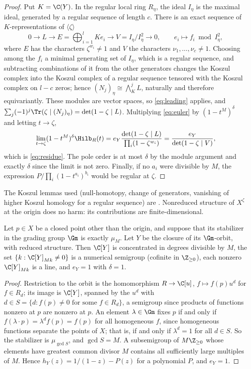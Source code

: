 \begin{proof}
Put $K=\C(Y)$. In the regular local ring $R_\eta$, the ideal $I_\eta$ is the
maximal ideal, generated by a regular sequence of length $c$. There is an
exact sequence of $K$-representations of $\langle\zeta\rangle$
\[
 0\to L\to E=\bigoplus_{i=1}^lKe_i\to V=I_\eta/I_\eta^2\to0,\qquad
 e_i\mapsto f_i\bmod I_\eta^2 ,
\]
where $E$ has the characters $\zeta^{w_i}\ne1$ and $V$ the characters
$\nu_1,\dots,\nu_c\ne1$. Choosing among the $f_i$ a minimal generating set of
$I_\eta$, which is a regular sequence, and subtracting combinations of it from
the other generators changes the Koszul complex into the Koszul complex of a
regular sequence tensored with the Koszul complex on $l-c$ zeros; hence
$(N_j)_\eta\cong\bigwedge^j_KL$, naturally and therefore equivariantly. These
modules are vector spaces, so \eqref{eq:leading} applies, and
$\sum_j(-1)^j\Tr(\zeta\mid(N_j)_\eta)=\det(1-\zeta\mid L)$. Multiplying
\eqref{eq:euler} by $(1-t^M)^\delta$ and letting $t\to\zeta$,
\[
 \lim_{t\to\zeta}(1-t^M)^\delta\Hilb_R(t)
 =e_Y\frac{\det(1-\zeta\mid L)}{\prod_i(1-\zeta^{w_i})}
 =\frac{e_Y}{\det(1-\zeta\mid V)} ,
\]
which is \eqref{eq:residue}. The pole order is at most $\delta$ by the module
argument and exactly $\delta$ since the limit is not zero. Finally, if no
$a_i$ were divisible by $M$, the expression $P/\prod_i(1-t^{a_i})^{b_i}$
would be regular at $\zeta$.
\end{proof}

The Koszul lemmas used (null-homotopy, change of generators, vanishing of
higher Koszul homology for a regular sequence) are
\cite[Tags 0621, 062F]{Stacks}. Nonreduced structure of $X^\zeta$ at the
origin does no harm: its contributions are finite-dimensional.

\begin{lemma}\label{lem:orbitclosure}
Let $p\in X$ be a closed point other than the origin, and suppose that its
stabilizer in the grading group $\Gm$ is exactly $\mu_M$. Let $Y$ be the
closure of its $\Gm$-orbit, with reduced structure. Then $\C[Y]$ is
concentrated in degrees divisible by $M$, the set $\{k:\C[Y]_{Mk}\ne0\}$ is a
numerical semigroup (cofinite in $\Z_{\ge0}$), each nonzero
$\C[Y]_{Mk}$ is a line, and $e_Y=1$ with $\delta=1$.
\end{lemma}

\begin{proof}
Restriction to the orbit is the homomorphism $R\to\C[u]$, $f\mapsto f(p)u^d$
for $f\in R_d$; its image is $\C[Y]$, spanned by the $u^d$ with $d\in S=\{d:
f(p)\ne0\text{ for some }f\in R_d\}$, a semigroup since products of functions
nonzero at $p$ are nonzero at $p$. An element $\lambda\in\Gm$ fixes $p$ if and
only if $f(\lambda\cdot p)=\lambda^df(p)=f(p)$ for all homogeneous $f$, since
homogeneous functions separate the points of $X$; that is, if and only if
$\lambda^d=1$ for all $d\in S$. So the stabilizer is $\mu_{\gcd S}$, and
$\gcd S=M$. A subsemigroup of $M\Z_{\ge0}$ whose elements have greatest
common divisor $M$ contains all sufficiently large multiples of $M$. Hence
$h_Y(z)=1/(1-z)-P(z)$ for a polynomial $P$, and $e_Y=1$.
\end{proof}

